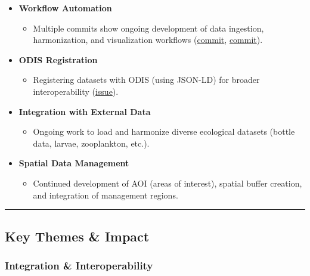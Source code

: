 \documentclass[
  letterpaper,
  DIV=11,
  numbers=noendperiod]{scrreprt}
\providecommand{\tightlist}{%
  \setlength{\itemsep}{0pt}\setlength{\parskip}{0pt}}
\begin{document}
\begin{itemize}
\tightlist
\item
  \textbf{Workflow Automation}

  \begin{itemize}
  \tightlist
  \item
    Multiple commits show ongoing development of data ingestion,
    harmonization, and visualization workflows
    (\href{https://github.com/CalCOFI/workflows/commit/38f813aff82327f00622c083f591c1a3bce4e55d}{commit},
    \href{https://github.com/CalCOFI/workflows/commit/81b6c27457c53f862873ce9a4021a759e0e5ad65}{commit}).
  \end{itemize}
\item
  \textbf{ODIS Registration}

  \begin{itemize}
  \tightlist
  \item
    Registering datasets with ODIS (using JSON-LD) for broader
    interoperability
    (\href{https://github.com/CalCOFI/workflows/issues/24}{issue}).
  \end{itemize}
\item
  \textbf{Integration with External Data}

  \begin{itemize}
  \tightlist
  \item
    Ongoing work to load and harmonize diverse ecological datasets
    (bottle data, larvae, zooplankton, etc.).
  \end{itemize}
\item
  \textbf{Spatial Data Management}

  \begin{itemize}
  \tightlist
  \item
    Continued development of AOI (areas of interest), spatial buffer
    creation, and integration of management regions.
  \end{itemize}
\end{itemize}

\begin{center}\rule{0.5\linewidth}{0.5pt}\end{center}

\subsection{Key Themes \& Impact}\label{key-themes-impact}

\subsubsection{Integration \&
Interoperability}\label{integration-interoperability}
\end{document}
